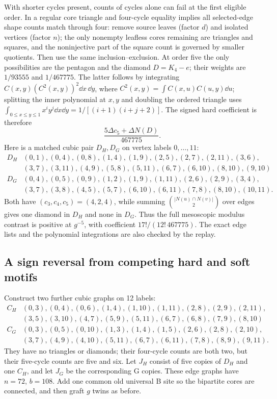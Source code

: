 With shorter cycles present, counts of cycles alone can fail at the first eligible order. In a regular core triangle and four-cycle equality implies all selected-edge shape counts match through four: remove source leaves (factor \(d\)) and isolated vertices (factor \(n\)); the only nonempty leafless cores remaining are triangles and squares, and the noninjective part of the square count is governed by smaller quotients. Then use the same inclusion--exclusion. At order five the only possibilities are the pentagon and the diamond \(D=K_4-e\); their weights are \(1/93555\) and \(1/467775\). The latter follows by integrating \(C(x,y)(C^2(x,y))^2\dd x\,\dd y\), where \(C^2(x,y)=\int C(x,u)C(u,y)\dd u\); splitting the inner polynomial at \(x,y\) and doubling the ordered triangle uses \(\int_{0\le x\le y\le1}x^iy^j\dd x\dd y=1/[(i+1)(i+j+2)]\). The signed hard coefficient is therefore
\begin{equation}\label{eq:diamond}
 \frac{5\Delta c_5+\Delta N(D)}{467775}.
\end{equation}
Here is a matched cubic pair \(D_H,D_G\) on vertex labels \(0,\ldots,11\):
\[
\begin{array}{c|l}
D_H&(0,1),(0,4),(0,8),(1,4),(1,9),(2,5),(2,7),(2,11),(3,6),\\
 &(3,7),(3,11),(4,9),(5,8),(5,11),(6,7),(6,10),(8,10),(9,10)\\
D_G&(0,4),(0,5),(0,9),(1,2),(1,9),(1,11),(2,6),(2,9),(3,4),\\
 &(3,7),(3,8),(4,5),(5,7),(6,10),(6,11),(7,8),(8,10),(10,11).
\end{array}
\]
Both have \((c_3,c_4,c_5)=(4,2,4)\), while summing \(\binom{|N(u)\cap N(v)|}{2}\) over edges gives one diamond in \(D_H\) and none in \(D_G\). Thus the full mesoscopic modulus contrast is positive at \(g^{-5}\), with coefficient \(17!/(12!\,467775)\). The exact edge lists and the polynomial integrations are also checked by the replay.

\subsection{A sign reversal from competing hard and soft motifs}\label{sec:reversal}
Construct two further cubic graphs on 12 labels:
\[
\begin{array}{c|l}
C_H&(0,3),(0,4),(0,6),(1,4),(1,10),(1,11),(2,8),(2,9),(2,11),\\
 &(3,5),(3,10),(4,7),(5,9),(5,11),(6,7),(6,8),(7,9),(8,10)\\
C_G&(0,3),(0,5),(0,10),(1,3),(1,4),(1,5),(2,6),(2,8),(2,10),\\
 &(3,7),(4,9),(4,10),(5,11),(6,7),(6,11),(7,8),(8,9),(9,11).
\end{array}
\]
They have no triangles or diamonds; their four-cycle counts are both two, but their five-cycle counts are five and six. Let \(J_H\) consist of five copies of \(D_H\) and one \(C_H\), and let \(J_G\) be the corresponding G copies. These edge graphs have \(n=72\), \(b=108\). Add one common old universal B site so the bipartite cores are connected, and then graft \(g\) twins as before.

